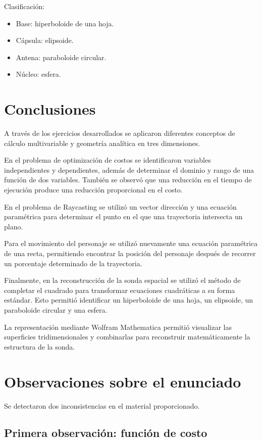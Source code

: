 \documentclass[12pt,a4paper]{article}
\begin{document}
Clasificación:

\begin{itemize}
    \item Base: hiperboloide de una hoja.
    \item Cápsula: elipsoide.
    \item Antena: paraboloide circular.
    \item Núcleo: esfera.
\end{itemize}


\section{Conclusiones}

A través de los ejercicios desarrollados se aplicaron diferentes
conceptos de cálculo multivariable y geometría analítica en tres
dimensiones.

En el problema de optimización de costos se identificaron variables
independientes y dependientes, además de determinar el dominio y
rango de una función de dos variables. También se observó que una
reducción en el tiempo de ejecución produce una reducción proporcional
en el costo.

En el problema de Raycasting se utilizó un vector dirección y una
ecuación paramétrica para determinar el punto en el que una trayectoria
intersecta un plano.

Para el movimiento del personaje se utilizó nuevamente una ecuación
paramétrica de una recta, permitiendo encontrar la posición del
personaje después de recorrer un porcentaje determinado de la
trayectoria.

Finalmente, en la reconstrucción de la sonda espacial se utilizó
el método de completar el cuadrado para transformar ecuaciones
cuadráticas a su forma estándar. Esto permitió identificar un
hiperboloide de una hoja, un elipsoide, un paraboloide circular y una
esfera.

La representación mediante Wolfram Mathematica permitió visualizar
las superficies tridimensionales y combinarlas para reconstruir
matemáticamente la estructura de la sonda.


\section{Observaciones sobre el enunciado}

Se detectaron dos inconsistencias en el material proporcionado.

\subsection{Primera observación: función de costo}
\end{document}
